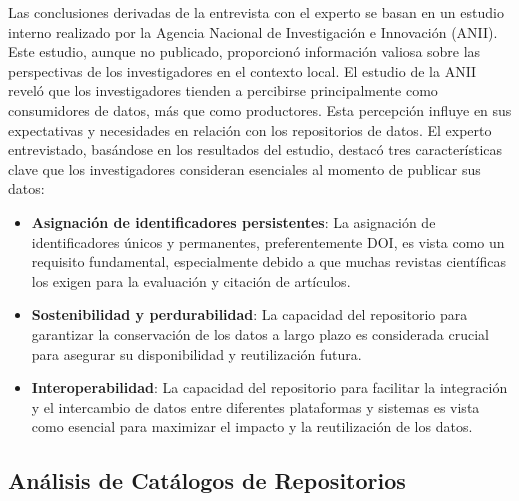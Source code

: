 \documentclass[runningheads]{llncs}
\begin{document}
Las conclusiones derivadas de la entrevista con el experto se basan en un estudio interno realizado por la Agencia Nacional de Investigación e Innovación (ANII). Este estudio, aunque no publicado, proporcionó información valiosa sobre las perspectivas de los investigadores en el contexto local.
El estudio de la ANII reveló que los investigadores tienden a percibirse principalmente como consumidores de datos, más que como productores. Esta percepción influye en sus expectativas y necesidades en relación con los repositorios de datos.
El experto entrevistado, basándose en los resultados del estudio, destacó tres características clave que los investigadores consideran esenciales al momento de publicar sus datos:
\begin{itemize}
    \item \textbf{Asignación de identificadores persistentes}: La asignación de identificadores únicos y permanentes, preferentemente DOI, es vista como un requisito fundamental, especialmente debido a que muchas revistas científicas los exigen para la evaluación y citación de artículos.
    \item \textbf{Sostenibilidad y perdurabilidad}: La capacidad del repositorio para garantizar la conservación de los datos a largo plazo es considerada crucial para asegurar su disponibilidad y reutilización futura.
    \item \textbf{Interoperabilidad}: La capacidad del repositorio para facilitar la integración y el intercambio de datos entre diferentes plataformas y sistemas es vista como esencial para maximizar el impacto y la reutilización de los datos.
\end{itemize}

\subsection{Análisis de Catálogos de Repositorios}
\end{document}
